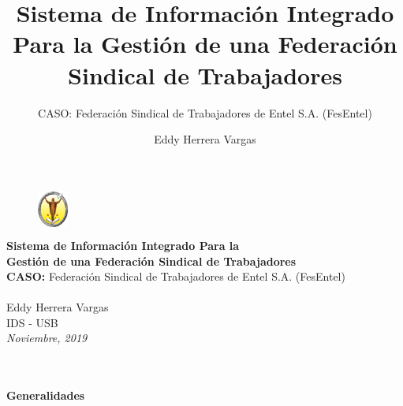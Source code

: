 \documentclass[xcolor=dvipsnames]{beamer}
\title{Sistema de Información Integrado Para la Gestión de una Federación Sindical de Trabajadores}
\subtitle{CASO: Federación Sindical de Trabajadores de Entel S.A. (FesEntel)}
\author{Eddy Herrera Vargas}
\institute{IDS - USB}
\begin{document}
\begin{frame}

    \begin{figure}
      \begin{columns}
        \column{\dimexpr\linewidth-35mm-5mm}
        \column{3mm}
        \includegraphics[width=10mm]{usb.pdf}
      \end{columns}
    \end{figure}

  \vspace{-3mm}
  \Large\textbf{\textcolor{color1}{Sistema de Información Integrado Para la\\ Gestión de una Federación Sindical de Trabajadores}}\\
  \vspace{3mm}
  \small{\textcolor{color2}{\textbf{CASO:} Federación Sindical de Trabajadores de Entel S.A. (FesEntel)}}\\
  \vspace{2mm}
  \color{color3}{\rule{10.5cm}{0.6pt}}\\
  \vspace{8mm}
  \textcolor{color1}{\small{Eddy Herrera Vargas}\\
  \vspace{2mm}
  \scriptsize{IDS - USB }\\
  \vspace{2mm}
  \textit{\scriptsize{Noviembre, 2019}}}

\end{frame}

\begin{frame}
    \centering\color{color3}{\rule{7cm}{5pt}}\\
    \vspace{-3mm}
    \centering\color{color3}{\rule{7cm}{1.5pt}}\\
    \vspace{2mm}
    \centering\textbf{\huge{\textcolor{color1}{Generalidades}}}\\
    \centering\color{color3}{\rule{7cm}{1.5pt}}\\
\end{frame}
\end{document}
